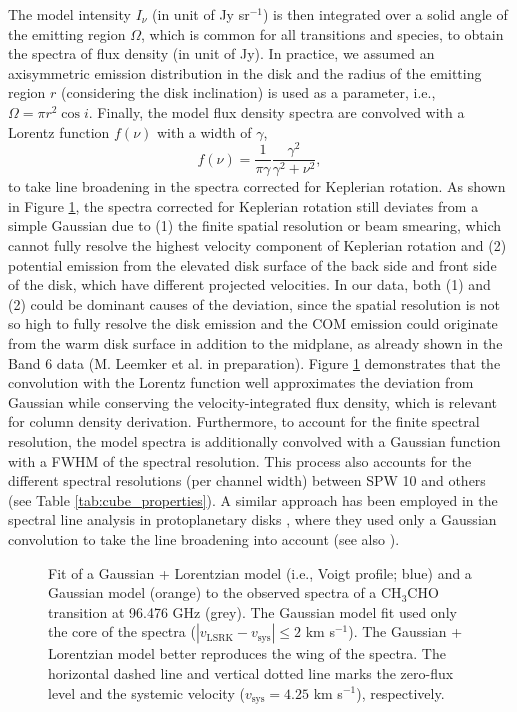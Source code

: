 \documentclass[linenumbers, twocolumn, twocolappendix, astrosymb, times]{aastex631}
\newcommand{\acetaldehyde}{CH$_3$CHO\xspace}
\begin{document}
The model intensity $I_\nu$ (in unit of Jy sr$^{-1}$) is then integrated over a solid angle of the emitting region $\Omega$, which is common for all transitions and species, to obtain the spectra of flux density (in unit of Jy). In practice, we assumed an axisymmetric emission distribution in the disk and the radius of the emitting region $r$ (considering the disk inclination) is used as a parameter, i.e., $\Omega = \pi r^2 \cos i$. Finally, the model flux density spectra are convolved with a Lorentz function $f(\nu)$ with a width of $\gamma$,
\begin{equation}
    f(\nu) = \frac{1}{\pi\gamma} \frac{\gamma^2}{\gamma^2 + \nu^2},
\end{equation}
to take line broadening in the spectra corrected for Keplerian rotation. As shown in Figure \ref{fig:Lorentzian_demo}, the spectra corrected for Keplerian rotation still deviates from a simple Gaussian due to (1) the finite spatial resolution or beam smearing, which cannot fully resolve the highest velocity component of Keplerian rotation and (2) potential emission from the elevated disk surface of the back side and front side of the disk, which have different projected velocities. In our data, both (1) and (2) could be dominant causes of the deviation, since the spatial resolution is not so high to fully resolve the disk emission and the COM emission could originate from the warm disk surface in addition to the midplane, as already shown in the Band 6 data (M. Leemker et al. in preparation). Figure \ref{fig:Lorentzian_demo} demonstrates that the convolution with the Lorentz function well approximates the deviation from Gaussian while conserving the velocity-integrated flux density, which is relevant for column density derivation. Furthermore, to account for the finite spectral resolution, the model spectra is additionally convolved with a Gaussian function with a FWHM of the spectral resolution. This process also accounts for the different spectral resolutions (per channel width) between SPW 10 and others (see Table \ref{tab:cube_properties}). A similar approach has been employed in the spectral line analysis in protoplanetary disks \citep{Cataldi2021}, where they used only a Gaussian convolution to take the line broadening into account (see also \citealt{Bergner2021, Guzman2021}).




\begin{figure}
\caption{Fit of a Gaussian + Lorentzian model (i.e., Voigt profile; blue) and a Gaussian model (orange) to the observed spectra of a \acetaldehyde transition at 96.476 GHz (grey). The Gaussian model fit used only the core of the spectra ($|v_\mathrm{LSRK} - v_\mathrm{sys}| \leq 2$ km s$^{-1}$). The Gaussian + Lorentzian model better reproduces the wing of the spectra. The horizontal dashed line and vertical dotted line marks the zero-flux level and the systemic velocity ($v_\mathrm{sys} = 4.25$ km s$^{-1}$), respectively.}
\label{fig:Lorentzian_demo}
\end{figure}
\end{document}
